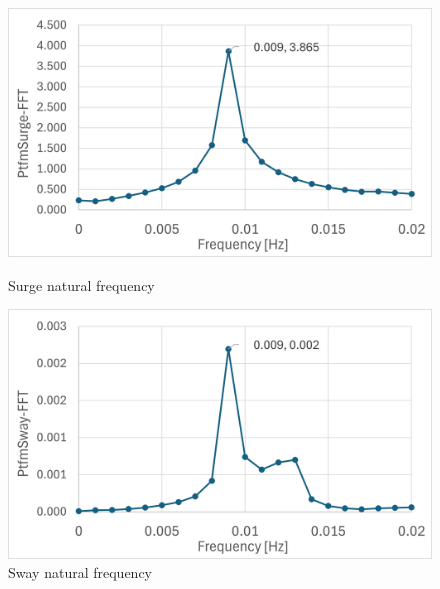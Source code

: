 \documentclass[a4paper, 11pt]{article}
\begin{document}
\begin{figure}[H]
    \begin{minipage}{0.49\textwidth}
        \centering
        \includegraphics[width=1\textwidth]{nat_freq_surge.png}
        \caption{\small Surge natural frequency}
        \label{fig:nat_freq_surge}
    \end{minipage}
    \hfill
    \begin{minipage}{0.5\textwidth}
        \centering
        \includegraphics[width=1\textwidth]{nat_freq_sway.png}
        \caption{\small Sway natural frequency}
        \label{fig:nat_freq_sway}
    \end{minipage}
\end{figure}
\end{document}
